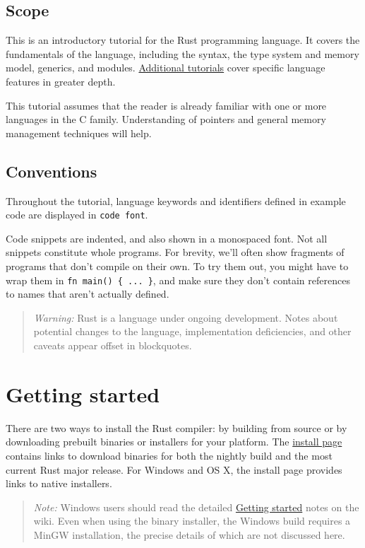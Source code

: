 \documentclass[]{article}
\begin{document}
\subsection{Scope}\label{scope}

This is an introductory tutorial for the Rust programming language. It
covers the fundamentals of the language, including the syntax, the type
system and memory model, generics, and modules.
\hyperref[what-nextux3f]{Additional tutorials} cover specific language
features in greater depth.

This tutorial assumes that the reader is already familiar with one or
more languages in the C family. Understanding of pointers and general
memory management techniques will help.

\subsection{Conventions}\label{conventions}

Throughout the tutorial, language keywords and identifiers defined in
example code are displayed in \texttt{code font}.

Code snippets are indented, and also shown in a monospaced font. Not all
snippets constitute whole programs. For brevity, we'll often show
fragments of programs that don't compile on their own. To try them out,
you might have to wrap them in \texttt{fn main() \{ ... \}}, and make
sure they don't contain references to names that aren't actually
defined.

\begin{quote}
\emph{Warning:} Rust is a language under ongoing development. Notes
about potential changes to the language, implementation deficiencies,
and other caveats appear offset in blockquotes.
\end{quote}

\section{Getting started}\label{getting-started}

There are two ways to install the Rust compiler: by building from source
or by downloading prebuilt binaries or installers for your platform. The
\href{http://www.rust-lang.org/install.html}{install page} contains
links to download binaries for both the nightly build and the most
current Rust major release. For Windows and OS X, the install page
provides links to native installers.

\begin{quote}
\emph{Note:} Windows users should read the detailed
\href{https://github.com/rust-lang/rust/wiki/Note-getting-started-developing-Rust}{Getting
started} notes on the wiki. Even when using the binary installer, the
Windows build requires a MinGW installation, the precise details of
which are not discussed here.
\end{quote}
\end{document}
